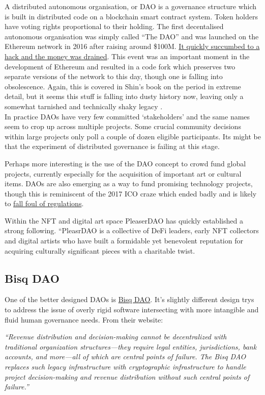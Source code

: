 A distributed autonomous organisation, or DAO is a governance structure which is built in distributed code on a blockchain smart contract system. Token holders have voting rights proportional to their holding. The first decentalised autonomous organisation was simply called ``The DAO'' and was launched on the Ethereum network in 2016 after raising around \$100M. \href{https://www.gemini.com/cryptopedia/the-dao-hack-makerdao#section-what-is-a-dao}{It quickly succumbed to a hack and the money was drained}. This event was an important moment in the development of Ethereum and resulted in a code fork which preserves two separate versions of the network to this day, though one is falling into obsolescence. Again, this is covered in Shin's book on the period in extreme detail, but it seems this stuff is falling into dusty history now, leaving only a somewhat tarnished and technically shaky legacy \cite{cryptopians}. \\
In practice DAOs have very few committed `stakeholders' and the same names seem to crop up across multiple projects. Some crucial community decisions within large projects only poll a couple of dozen eligible participants. Its might be that the experiment of distributed governance is failing at this stage. \par
Perhaps more interesting is the use of the DAO concept to crowd fund global projects, currently especially for the acquisition of important art or cultural items. DAOs are also emerging as a way to fund promising technology projects, though this is reminiscent of the 2017 ICO craze which ended badly and is likely to \href{https://www.cftc.gov/PressRoom/PressReleases/8590-22}{fall foul of regulations}.\par
Within the NFT and digital art space  PleaserDAO has quickly established a strong following.
``PleasrDAO is a collective of DeFi leaders, early NFT collectors and digital artists who have built a formidable yet benevolent reputation for acquiring culturally significant pieces with a charitable twist.\par

\subsection{Bisq DAO}
One of the better designed DAOs is \href{https://bisq.network/dao/}{Bisq DAO}. It's slightly different design trys to address the issue of overly rigid software intersecting with more intangible and fluid human governance needs. From their website:\par
\textit{``Revenue distribution and decision-making cannot be decentralized with traditional organization structures—they require legal entities, jurisdictions, bank accounts, and more—all of which are central points of failure.
The Bisq DAO replaces such legacy infrastructure with cryptographic infrastructure to handle project decision-making and revenue distribution without such central points of failure.''}

